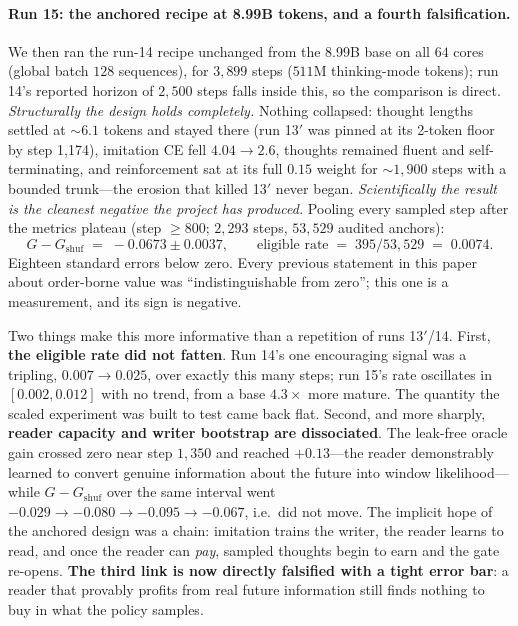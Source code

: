 \documentclass{article} %
\newcommand{\gain}{G}
\begin{document}
\paragraph{Run 15: the anchored recipe at 8.99B tokens, and a fourth falsification.} We then ran the run-14 recipe unchanged from the 8.99B base on all $64$ cores (global batch $128$ sequences), for $3{,}899$ steps ($511$M thinking-mode tokens); run 14's reported horizon of $2{,}500$ steps falls inside this, so the comparison is direct. \emph{Structurally the design holds completely.} Nothing collapsed: thought lengths settled at ${\sim}6.1$ tokens and stayed there (run 13$'$ was pinned at its 2-token floor by step 1{,}174), imitation CE fell $4.04 \to 2.6$, thoughts remained fluent and self-terminating, and reinforcement sat at its full $0.15$ weight for ${\sim}1{,}900$ steps with a bounded trunk---the erosion that killed 13$'$ never began. \emph{Scientifically the result is the cleanest negative the project has produced.} Pooling every sampled step after the metrics plateau (step ${\ge}800$; $2{,}293$ steps, $53{,}529$ audited anchors):
\begin{equation*}
\gain - \gain_{\mathrm{shuf}} \;=\; -0.0673 \pm 0.0037, \qquad \text{eligible rate} \;=\; 395/53{,}529 \;=\; 0.0074 .
\end{equation*}
Eighteen standard errors below zero. Every previous statement in this paper about order-borne value was ``indistinguishable from zero''; this one is a measurement, and its sign is negative.

Two things make this more informative than a repetition of runs 13$'$/14. First, \textbf{the eligible rate did not fatten}. Run 14's one encouraging signal was a tripling, $0.007 \to 0.025$, over exactly this many steps; run 15's rate oscillates in $[0.002, 0.012]$ with no trend, from a base $4.3\times$ more mature. The quantity the scaled experiment was built to test came back flat. Second, and more sharply, \textbf{reader capacity and writer bootstrap are dissociated}. The leak-free oracle gain crossed zero near step $1{,}350$ and reached $+0.13$---the reader demonstrably learned to convert genuine information about the future into window likelihood---while $\gain - \gain_{\mathrm{shuf}}$ over the same interval went $-0.029 \to -0.080 \to -0.095 \to -0.067$, i.e.\ did not move. The implicit hope of the anchored design was a chain: imitation trains the writer, the reader learns to read, and once the reader can \emph{pay}, sampled thoughts begin to earn and the gate re-opens. \textbf{The third link is now directly falsified with a tight error bar}: a reader that provably profits from real future information still finds nothing to buy in what the policy samples.
\end{document}
